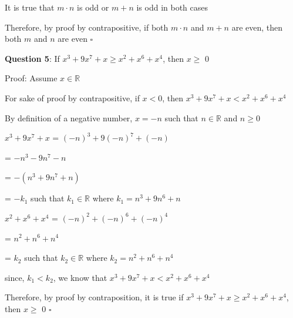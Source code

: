 \documentclass{article} %
\newcommand{\question}[2][]{\begin{flushleft}
        \textbf{Question #1}: #2
\end{flushleft}}
\begin{document}
    \vspace*{0.1cm}

    It is true that $m \cdot n$ is odd or $m+n$ is odd in both cases

    Therefore, by proof by contrapositive, if both $m \cdot n$ and $m+n$ are even, then both $m$ and $n$ are 
    \tabto{0.5cm}even $\square$

                                                                   

    \question[5]{If $x^3 + 9x^7 + x \geq x^2+x^6+x^4$, then $x \geq$ 0}

    Proof: Assume $x \in \mathbb{R}$

    For sake of proof by contrapositive, if $x < 0$, then $x^3 + 9x^7 + x < x^2+x^6+x^4$

    By definition of a negative number, $x = -n$ such that $n \in \mathbb{R}$ and $n \geq 0$

    $x^3 + 9x^7 + x$ = $(-n)^3 + 9(-n)^7 + (-n)$

    \tabto{2.6cm} = $-n^3 - 9n^7 - n$

    \tabto{2.6cm} = $-(n^3 + 9n^7 + n)$

    \tabto{2.6cm} = $-k_1$ such that $k_1 \in \mathbb{R}$ where $k_1 = n^3 + 9n^6 + n$

    $x^2+x^6+x^4$ = $(-n)^2+(-n)^6+(-n)^4$

    \tabto{2.6cm} = $n^2+n^6+n^4$

    \tabto{2.6cm} = $k_2$ such that $k_2 \in \mathbb{R}$ where $k_2 = n^2+n^6+n^4$

    since, $k_1 < k_2$, we know that $x^3 + 9x^7 + x < x^2+x^6+x^4$

    Therefore, by proof by contraposition, it is true if $x^3 + 9x^7 + x \geq x^2+x^6+x^4$, then $x \geq$ 0 $\square$

    \newpage

                                                                   
\end{document}
